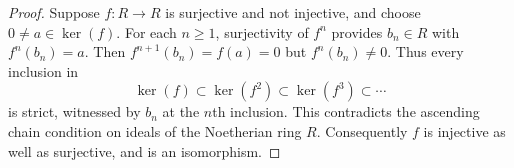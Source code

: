 \begin{proof}
Suppose $f:R\to R$ is surjective and not injective, and choose
$0\ne a\in\ker(f)$. For each $n\geq1$, surjectivity of $f^n$
provides $b_n\in R$ with $f^n(b_n)=a$. Then
$f^{n+1}(b_n)=f(a)=0$ but $f^n(b_n)\ne0$.
Thus every inclusion in
$$
\ker(f)\subset\ker(f^2)\subset\ker(f^3)\subset\cdots
$$
is strict, witnessed by $b_n$ at the $n$th inclusion. This contradicts
the ascending chain condition on ideals of the Noetherian ring $R$.
Consequently $f$ is injective as well as surjective, and is an isomorphism.
\end{proof}







